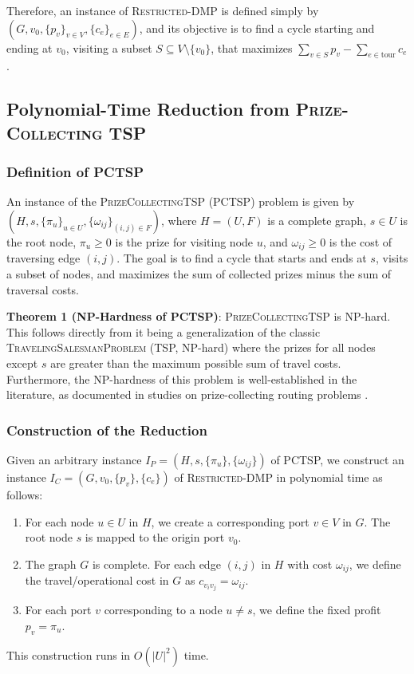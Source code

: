 \documentclass{article} \usepackage[english]{babel} \usepackage[utf8]{inputenc}
\begin{document}
Therefore, an instance of \textsc{Restricted-DMP} is defined simply by $(G, v_0,
\{p_v\}_{v \in V}, \{c_{e}\}_{e \in E})$, and its objective is to find a cycle
starting and ending at $v_0$, visiting a subset $S \subseteq V \setminus
\{v_0\}$, that maximizes $\sum_{v \in S} p_v - \sum_{e \in \text{tour}} c_{e}$.

\subsection{Polynomial-Time Reduction from \textsc{Prize-Collecting TSP}}
\label{subsec:reduction_pctsp}

\subsubsection*{Definition of PCTSP} An instance of the
\textsc{PrizeCollectingTSP} (PCTSP) problem is given by $(H, s, \{\pi_u\}_{u \in U}, \{\omega_{ij}\}_{(i,j) \in F})$, where $H=(U, F)$ is a complete graph, $s
\in U$ is the root node, $\pi_u \geq 0$ is the prize for visiting node $u$, and
$\omega_{ij} \geq 0$ is the cost of traversing edge $(i,j)$. The goal is to find
a cycle that starts and ends at $s$, visits a subset of nodes, and maximizes the
sum of collected prizes minus the sum of traversal costs.

\textbf{Theorem 1 (NP-Hardness of PCTSP)}: \textsc{PrizeCollectingTSP} is NP-hard. This follows directly from it being a generalization of the classic \textsc{TravelingSalesmanProblem} (TSP, NP-hard) where the prizes for all nodes except $s$ are greater than the maximum possible sum of travel costs. Furthermore, the NP-hardness of this problem is well-established in the literature, as documented in studies on prize-collecting routing problems \cite{MarchettiSpaccamela2007PrizeCollectingTS}.

\subsubsection*{Construction of the Reduction} Given an arbitrary instance
$I_{P} = (H, s, \{\pi_u\}, \{\omega_{ij}\})$ of PCTSP, we construct an instance
$I_{C} = (G, v_0, \{p_v\}, \{c_{e}\})$ of \textsc{Restricted-DMP} in polynomial
time as follows: \begin{enumerate} \item For each node $u \in U$ in $H$, we
create a corresponding port $v \in V$ in $G$. The root node $s$ is mapped to the
origin port $v_0$. \item The graph $G$ is complete. For each edge $(i,j)$ in $H$
with cost $\omega_{ij}$, we define the travel/operational cost in $G$ as $c_{v_i
v_j} = \omega_{ij}$. \item For each port $v$ corresponding to a node $u \neq s$,
we define the fixed profit $p_v = \pi_u$. \end{enumerate} This construction runs
in $O(|U|^2)$ time.
\end{document}
